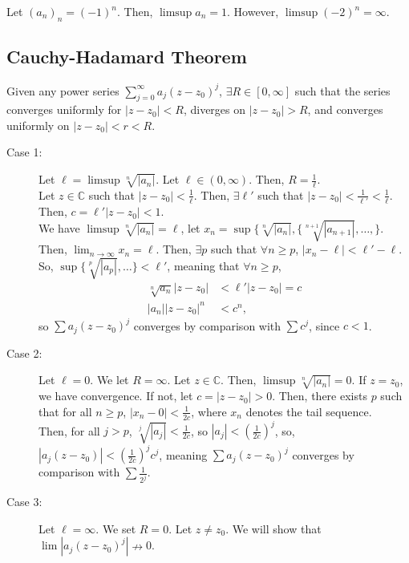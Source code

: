 \documentclass[10pt]{extarticle}
\newcommand{\C}{\mathbb{C}}
\begin{document}
  Let $(a_n)_n = (-1)^n$. Then, $\limsup a_n = 1$. However, $\limsup (-2)^n = \infty$.\\
  \subsection{Cauchy-Hadamard Theorem}%
  Given any power series $\sum_{j=0}^{\infty}a_j(z-z_0)^j$, $\exists R \in [0,\infty]$ such that the series converges uniformly for $|z-z_0| < R$, diverges on $|z-z_0| > R$, and converges uniformly on $|z-z_0| < r < R$.

  \begin{description}
    \item[Case 1:] Let $\ell = \limsup \sqrt[n]{|a_n|}$. Let $\ell \in (0,\infty)$. Then, $R = \frac{1}{\ell}$.\\

      Let $z\in\C$ such that $|z-z_0| < \frac{1}{\ell}$. Then, $\exists \ell'$ such that $|z-z_0| < \frac{1}{\ell'} < \frac{1}{\ell}$. Then, $c = \ell'|z-z_0| < 1$.\\

      We have $\limsup \sqrt[n]{|a_n|} = \ell$, let $x_n = \sup\{\sqrt[n]{|a_n|},\{\sqrt[n+1]{|a_{n+1}|},\dots,\}$. Then, $\lim_{n\rightarrow\infty}x_n = \ell$. Then, $\exists p$ such that $\forall n \geq p$, $|x_n - \ell| < \ell'-\ell$. So, $\sup\{\sqrt[p]{|a_{p}|},\dots\} < \ell'$, meaning that $\forall n \geq p$,
        \begin{align*}
          \sqrt[n]{a_n}|z-z_0| &< \ell'|z-z_0| = c\\
          |a_n||z-z_0|^n &< c^n,
        \end{align*}
        so $\sum a_j(z-z_0)^j$ converges by comparison with $\sum c^j$, since $c < 1$.
      \item[Case 2:] Let $\ell = 0$. We let $R = \infty$. Let $z\in \C$. Then, $\limsup \sqrt[n]{|a_n|} = 0$. If $z = z_0$, we have convergence. If not, let $c = |z-z_0| > 0$. Then, there exists $p$ such that for all $n \geq p$, $|x_n - 0| < \frac{1}{2c}$, where $x_n$ denotes the tail sequence.\\

        Then, for all $j > p$, $\sqrt[j]{|a_j|} < \frac{1}{2c}$, so $|a_j| < \left(\frac{1}{2c}\right)^j$, so, $|a_j(z-z_0)| < \left(\frac{1}{2c}\right)^jc^j$, meaning $\sum a_j(z-z_0)^j$ converges by comparison with $\sum \frac{1}{2^j}$.
      \item[Case 3:] Let $\ell = \infty$. We set $R = 0$. Let $z\neq z_0$. We will show that $\lim |a_j(z-z_0)^j|\nrightarrow 0$.
  \end{description}
\end{document}
